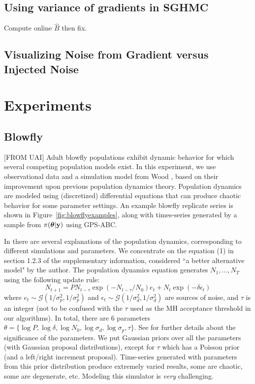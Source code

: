 \documentclass[]{article}
\begin{document}
\subsection{Using variance of gradients in SGHMC}
Compute online $\hat{B}$ then fix.

\subsection{Visualizing Noise from Gradient versus Injected Noise}

\section{Experiments}\label{sec:experiments}

\subsection{Blowfly}
[FROM UAI] Adult blowfly populations exhibit dynamic behavior for which several competing population models exist.  In this experiment, we use observational data and a simulation model from Wood \cite{wood2010statistical}, based on their improvement upon previous population dynamics theory.  Population dynamics are modeled using (discretized) differential equations that can produce chaotic behavior for some parameter settings.  An example blowfly replicate series is shown in Figure~\ref{fig:blowflyexamples}, along with  times-series generated by a sample from $\pi({\bm \theta}|{\bf y})$ using GPS-ABC.
 

In \cite{wood2010statistical} there are several explanations of the population dynamics, corresponding to different simulations and parameters.  We concentrate on the equation (1) in section 1.2.3 of the supplementary information, considered ``a better alternative model" by the author.  The population dynamics equation generates  $N_1, \ldots, N_T$ using the following update rule:
\begin{equation}
N_{t+1} = P N_{t-\tau} \exp(-N_{t-\tau}/N_0) e_t + N_t \exp(-\delta \epsilon_t) \nonumber
\end{equation}
where $e_t \sim  \mathcal{G}( 1/{\sigma_p^2},1/{\sigma_p^2})$ and $\epsilon_t 
 \sim  \mathcal{G}( 1/{\sigma_d^2},1/{\sigma_d^2})$  
are sources of noise, and $\tau$ is an integer (not to be confused with the $\tau$ used as the MH acceptance threshold in our algorithms).  In total, there are 6 parameters $\theta = \{ \log P, \log \delta, \log N_0, \log \sigma_d, \log \sigma_p, \tau\}$.  See \cite{wood2010statistical} for further details about the significance of the parameters.  We put Gaussian priors over all the parameters (with Gaussian proposal distributions), except for $\tau$ which has a Poisson prior (and a left/right increment proposal). Time-series generated with parameters from this prior distribution produce extremely varied results, some are chaotic, some are degenerate, etc.  Modeling this simulator is {\em very} challenging.
\end{document}
